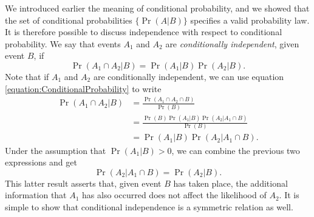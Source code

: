 We introduced earlier the meaning of conditional probability, and we showed that the set of conditional probabilities $\{ \Pr (A|B) \}$ specifies a valid probability law.
It is therefore possible to discuss independence with respect to conditional probability.
We say that events $A_1$ and $A_2$ are \emph{conditionally independent}, given event $B$, if 
\begin{equation*}
\Pr (A_1 \cap A_2 | B) = \Pr (A_1 | B) \Pr (A_2 | B) .
\end{equation*}
Note that if $A_1$ and $A_2$ are conditionally independent, we can use equation \eqref{equation:ConditionalProbability} to write
\begin{equation*}
\begin{split}
\Pr (A_1 \cap A_2 | B) &= \frac{ \Pr (A_1 \cap A_2 \cap  B) }{\Pr (B)} \\
&= \frac{ \Pr (B) \Pr (A_1 | B) \Pr (A_2 | A_1 \cap  B) }{\Pr (B)} \\
&= \Pr (A_1 | B) \Pr (A_2 | A_1 \cap  B) .
\end{split}
\end{equation*}
Under the assumption that $\Pr (A_1 | B) > 0$, we can combine the previous two expressions and get
\begin{equation*}
\Pr (A_2 | A_1 \cap  B) = \Pr (A_2 | B) .
\end{equation*}
This latter result asserts that, given event $B$ has taken place, the additional information that $A_1$ has also occurred does not affect the likelihood of $A_2$.
It is simple to show that conditional independence is a symmetric relation as well.

